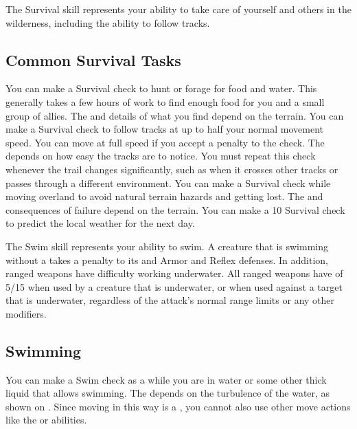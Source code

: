 \newpage
{}
        The Survival skill represents your ability to take care of yourself and others in the wilderness, including the ability to follow tracks.

    \subsection{Common Survival Tasks}
         You can make a Survival check to hunt or forage for food and water.
        This generally takes a few hours of work to find enough food for you and a small group of allies.
        The  and details of what you find depend on the terrain.
         You can make a Survival check to follow tracks at up to half your normal movement speed.
        You can move at full speed if you accept a  penalty to the check.
        The  depends on how easy the tracks are to notice.
        You must repeat this check whenever the trail changes significantly, such as when it crosses other tracks or passes through a different environment.
         You can make a Survival check while moving overland to avoid natural terrain hazards and getting lost.
        The  and consequences of failure depend on the terrain.
         You can make a  10 Survival check to predict the local weather for the next day.

\newpage
{}
        The Swim skill represents your ability to swim.
        A creature that is swimming without a  takes a  penalty to its  and Armor and Reflex defenses.
        In addition, ranged weapons have difficulty working underwater.
        All ranged weapons have  of 5/15 when used by a creature that is underwater, or when used against a target that is underwater, regardless of the attack's normal range limits or any other modifiers.

    \subsection{Swimming}
        You can make a Swim check as a  while you are in water or some other thick liquid that allows swimming.
        The  depends on the turbulence of the water, as shown on .
        Since moving in this way is a , you cannot also use other move actions like the  or  abilities.

